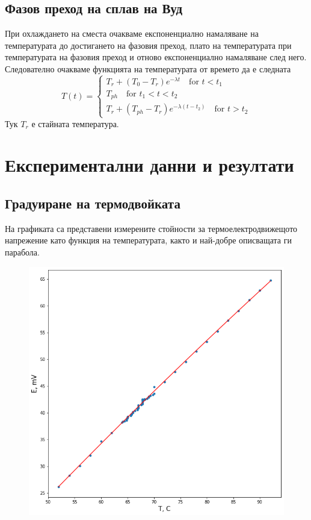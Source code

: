 \documentclass[aps, prb, twocolumn, a4paper, floatfix, reprint]{revtex4-2}
\begin{document}
\subsection{Фазов преход на сплав на Вуд}
При охлаждането на сместа очакваме експоненциално намаляване на температурата до достигането на фазовия преход, плато на температурата при температурата на фазовия преход и отново експоненциално намаляване след него. Следователно очакваме функцията на температурата от времето да е следната
\begin{equation*}
    T(t) = \begin{cases}
        T_r + (T_0 - T_r) e^{-\lambda t} \quad \text{for } t < t_1 \\
        T_{ph} \quad \text{for } t_1 < t < t_2 \\
        T_r + (T_{ph} - T_r) e^{-\lambda (t - t_2)} \quad \text{for } t > t_2
    \end{cases} 
\end{equation*}
Тук $T_r$ е стайната температура. 

\section{Експериментални данни и резултати}
\subsection{Градуиране на термодвойката}
На графиката са представени измерените стойности за термоелектродвижещото напрежение като функция на температурата, както и най-добре описващата ги парабола. 

\begin{figure}[H]
    \centering
    \includegraphics[width=0.9\columnwidth, keepaspectratio=true]{graduirane.png}
\end{figure}
\end{document}
